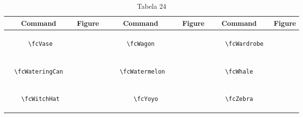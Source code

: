 \documentclass[x11names]{article}
\begin{document}
\begin{table}[H]\centering\begin{tabular}{|c|c|c|c|c|c|}\hline{\bf Command} & {\bf Figure} & {\bf Command} & {\bf Figure} & {\bf Command} & {\bf Figure}\\	\hline	&\multirow{5}{*}{	\fcVase	[scale=0.4]} & &\multirow{5}{*}{	\fcWagon	[scale=0.4]} & &\multirow{5}{*}{	\fcWardrobe	[scale=0.4]}\\	& & & & & \\	& & & & & \\	\verb|	\fcVase	| & & \verb|	\fcWagon	| & & \verb|	\fcWardrobe	| & \\	& & & & & \\	& & & & & \\	& & & & & \\	\hline									
		&\multirow{5}{*}{	\fcWateringCan	[scale=0.4]} & &\multirow{5}{*}{	\fcWatermelon	[scale=0.8]} & &\multirow{5}{*}{	\fcWhale	[scale=0.4]}\\	& & & & & \\	& & & & & \\	\verb|	\fcWateringCan	| & & \verb|	\fcWatermelon	| & & \verb|	\fcWhale	| & \\	& & & & & \\	& & & & & \\	& & & & & \\	\hline									
		&\multirow{5}{*}{	\fcWitchHat	[scale=0.8]} & &\multirow{5}{*}{	\fcYoyo	[scale=0.4]} & &\multirow{5}{*}{	\fcZebra	[scale=0.4]}\\	& & & & & \\	& & & & & \\	\verb|	\fcWitchHat	| & & \verb|	\fcYoyo	| & & \verb|	\fcZebra	| & \\	& & & & & \\	& & & & & \\	& & & & & \\		\hline 	\hline 	\end{tabular}	\caption{	Tabela 24	}\label{Tab24}\end{table}




	
\end{document}
